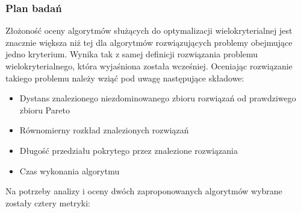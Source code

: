 \documentclass[twoside]{iisthesis}
\begin{document}
\subsubsection{Plan badań}
Złożoność oceny algorytmów służących do optymalizacji wielokryterialnej jest znacznie większa niż tej dla algorytmów rozwiązujących problemy obejmujące jedno kryterium. Wynika tak z samej definicji rozwiązania problemu wielokryterialnego, która wyjaśniona została wcześniej. Oceniając rozwiązanie takiego problemu należy wziąć pod uwagę następujące składowe:
\begin{itemize}
	\item Dystans znalezionego niezdominowanego zbioru rozwiązań od prawdziwego zbioru Pareto
	\item Równomierny rozkład znalezionych rozwiązań
	\item Długość przedziału pokrytego przez znalezione rozwiązania
	\item Czas wykonania algorytmu\\
\end{itemize}
Na potrzeby analizy i oceny dwóch zaproponowanych algorytmów wybrane zostały cztery metryki:
\end{document}
